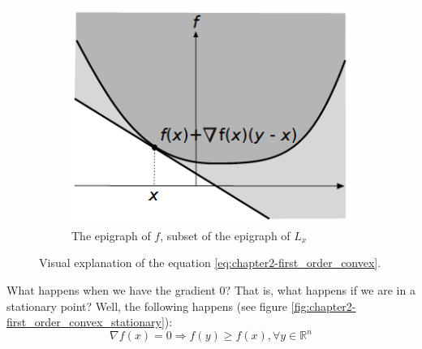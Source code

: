 \begin{figure}
    \hspace*{\fill} %
    \begin{subfigure}{0.31\textwidth}
    \includegraphics[width=\linewidth]{figures/2/first-order-convex/6.png}
    \caption{The epigraph of $f$, subset of the epigraph of $L_x$} \label{fig:foc6}
    \end{subfigure}
    \caption{Visual explanation of the equation \ref{eq:chapter2-first_order_convex}.}
    \label{fig:chapter2-first_order_convex}
\end{figure}
\par What happens when we have the gradient 0? That is, what happens if we are in a stationary point? Well, the following happens (see figure \ref{fig:chapter2-first_order_convex_stationary}):
\begin{equation}
    \nabla f(x) = 0 \Rightarrow f(y) \geq f(x), \forall y \in \mathbb{R}^n
    \label{eq:chapter2-first_order_convex_stationary}
\end{equation}
